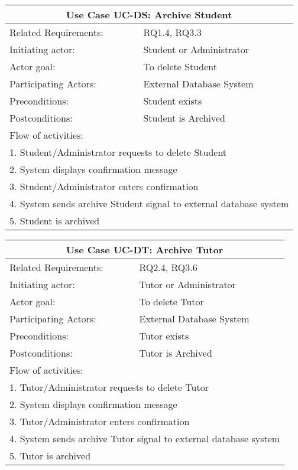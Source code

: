 \documentclass[12pt]{article}
\begin{document}
{		\begin{tabular}{| l | p{10cm}| }
			\hline\multicolumn{2}{|c|}{ \textbf{Use Case UC-DS: Archive Student}} \\ \hline
			Related Requirements: & RQ1.4, RQ3.3 \\ \hline
			Initiating actor: & Student or Administrator \\ \hline
			Actor goal: & To delete Student\\ \hline
			Participating Actors: & External Database System\\ \hline
			Preconditions: &Student exists\\ \hline
			Postconditions: & Student is Archived\\ \hline
			\multicolumn{2}{|l|}{Flow of activities:}\\ \hline
			\multicolumn{2}{|p{15cm}|}{1. Student/Administrator requests to delete Student}\\
			\multicolumn{2}{|p{15cm}|}{2. System displays confirmation message}\\
			\multicolumn{2}{|p{15cm}|}{3. Student/Administrator enters confirmation}	\\		
			\multicolumn{2}{|p{15cm}|}{4. System sends archive Student signal to external database system}\\
			\multicolumn{2}{|l|}{5. Student is archived}	
			\\ \hline		
		\end{tabular}
		
		\begin{tabular}{| l | p{10cm}| }
			\hline\multicolumn{2}{|c|}{ \textbf{Use Case UC-DT: Archive Tutor}} \\ \hline
			Related Requirements: & RQ2.4, RQ3.6 \\ \hline
			Initiating actor: & Tutor or Administrator \\ \hline
			Actor goal: & To delete Tutor\\ \hline
			Participating Actors: & External Database System\\ \hline
			Preconditions:& Tutor exists\\ \hline
			Postconditions: & Tutor is Archived\\ \hline
			\multicolumn{2}{|l|}{Flow of activities:}\\ \hline
			\multicolumn{2}{|p{15cm}|}{1. Tutor/Administrator requests to delete Tutor}\\
			\multicolumn{2}{|p{15cm}|}{2. System displays confirmation message}\\
			\multicolumn{2}{|p{15cm}|}{3. Tutor/Administrator enters confirmation}	\\		
			\multicolumn{2}{|p{15cm}|}{4. System sends archive Tutor signal to external database system}\\
			\multicolumn{2}{|l|}{5. Tutor is archived}	
			\\ \hline		
		\end{tabular}
		
}
\end{document}
